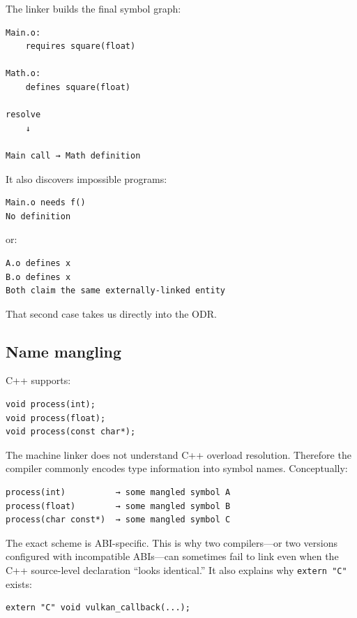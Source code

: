 The linker builds the final symbol graph:

\begin{verbatim}
Main.o:
    requires square(float)

Math.o:
    defines square(float)

resolve
    ↓

Main call → Math definition
\end{verbatim}

It also discovers impossible programs:

\begin{verbatim}
Main.o needs f()
No definition
\end{verbatim}

or:

\begin{verbatim}
A.o defines x
B.o defines x
Both claim the same externally-linked entity
\end{verbatim}

That second case takes us directly into the ODR.

\subsection{Name mangling}\label{01-foundations-i-ch002-name-mangling}

C++ supports:

\begin{verbatim}
void process(int);
void process(float);
void process(const char*);
\end{verbatim}

The machine linker does not understand C++ overload resolution. Therefore the compiler commonly encodes type information into symbol names. Conceptually:

\begin{verbatim}
process(int)          → some mangled symbol A
process(float)        → some mangled symbol B
process(char const*)  → some mangled symbol C
\end{verbatim}

The exact scheme is ABI-specific. This is why two compilers---or two versions configured with incompatible ABIs---can sometimes fail to link even when the C++ source-level declaration ``looks identical.'' It also explains why \texttt{extern\ "C"} exists:

\begin{verbatim}
extern "C" void vulkan_callback(...);
\end{verbatim}

